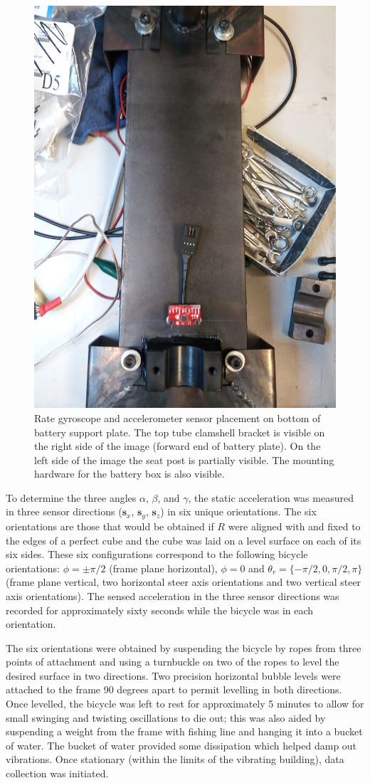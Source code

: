 \begin{figure}[htbp]
  \centering
  \includegraphics[width=.6\textwidth,angle=90]{images/IMG_20130325_195226.jpg}
  \caption[Rate gyroscope and accelerometer sensor placement.]{Rate gyroscope
    and accelerometer sensor placement on bottom of battery support plate. The
    top tube clamshell bracket is visible on the right side of the image
    (forward end of battery plate). On the left side of the image the seat post
    is partially visible. The mounting hardware for the battery box is also
    visible.}
  \label{rb:img:imuplacement}
\end{figure}

To determine the three angles $\alpha$, $\beta$, and $\gamma$, the static
acceleration was measured in three sensor directions ($\bm{s}_x$, $\bm{s}_y$,
$\bm{s}_z$) in six unique orientations. The six orientations are those that
would be obtained if $R$ were aligned with and fixed to the edges of a perfect
cube and the cube was laid on a level surface on each of its six sides.  These
six configurations correspond to the following bicycle orientations:
$\phi=\pm\pi/2$ (frame plane horizontal), $\phi=0$ and $\theta_r = \{-\pi/2, 0,
\pi/2, \pi\}$ (frame plane vertical, two horizontal steer axis orientations and
two vertical steer axis orientations). The sensed acceleration in the three sensor
directions was recorded for approximately sixty seconds while the bicycle was
in each orientation.

The six orientations were obtained by suspending the bicycle by ropes from
three points of attachment and using a turnbuckle on two of the ropes to level
the desired surface in two directions. Two precision horizontal bubble levels
were attached to the frame 90 degrees apart to permit levelling in both
directions.  Once levelled, the bicycle was left to rest for approximately 5
minutes to allow for small swinging and twisting oscillations to die out; this
was also aided by suspending a weight from the frame with fishing line and
hanging it into a bucket of water. The bucket of water provided some
dissipation which helped damp out vibrations. Once stationary (within the
limits of the vibrating building), data collection was initiated.

